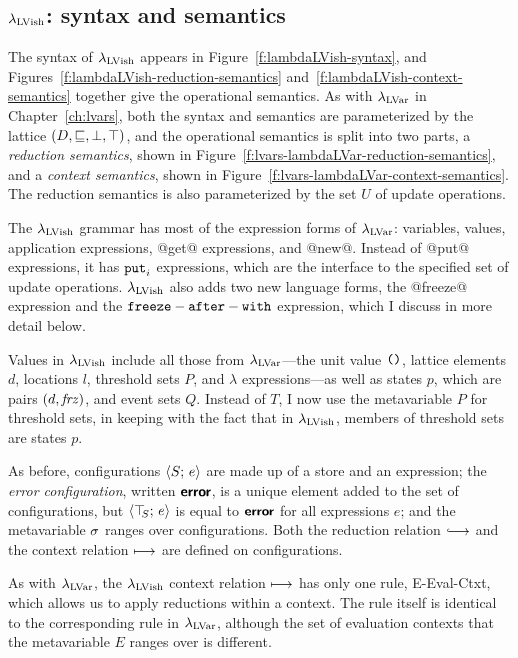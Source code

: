 \subsection{$\lambda_{\textrm{LVish}}$: syntax and semantics}

\FigLambdaLVishGrammar

\FigLambdaLVishReductionSemantics

\FigLambdaLVishContextSemantics

The syntax of $\lambda_{\textrm{LVish}}$ appears in
Figure~\ref{f:lambdaLVish-syntax}, and
Figures~\ref{f:lambdaLVish-reduction-semantics}
and~\ref{f:lambdaLVish-context-semantics} together give the
operational semantics.  As with $\lambda_{\textrm{LVar}}$ in
Chapter~\ref{ch:lvars}, both the syntax and semantics are
parameterized by the lattice $(D, \sqsubseteq, \bot, \top)$, and the
operational semantics is split into two parts, a \emph{reduction
  semantics}, shown in
Figure~\ref{f:lvars-lambdaLVar-reduction-semantics}, and a
\emph{context semantics}, shown in
Figure~\ref{f:lvars-lambdaLVar-context-semantics}.  The reduction
semantics is also parameterized by the set $U$ of update operations.

The $\lambda_{\textrm{LVish}}$ grammar has most of the expression forms of
$\lambda_{\textrm{LVar}}$: variables, values, application expressions, @get@
expressions, and @new@.  Instead of @put@ expressions, it has $\mbox{\texttt{put}}_i$
expressions, which are the interface to the specified set of update
operations.  $\lambda_{\textrm{LVish}}$ also adds two new language forms, the
@freeze@ expression and the ${\mbox{\texttt{freeze}}-\mbox{\texttt{after}}-\mbox{\texttt{with}}}$ expression, which I discuss in more
detail below.

Values in $\lambda_{\textrm{LVish}}$ include all those from $\lambda_{\textrm{LVar}}$---the
unit value $\mbox{\texttt{()}}$, lattice elements $d$, locations $l$, threshold
sets $P$, and $\lambda$ expressions---as well as states $p$, which are
pairs $(d, \mathit{frz})$, and event sets $Q$.  Instead of $T$, I now
use the metavariable $P$ for threshold sets, in keeping with the fact
that in $\lambda_{\textrm{LVish}}$, members of threshold sets are states $p$.

As before, configurations $\langle S;\, e \rangle$ are made up of a store and
an expression; the \emph{error configuration}, written $\textbf{\textsf{error}}$, is a
unique element added to the set of configurations, but
$\langle \top\hspace{-0.85mm}_{S};\, e \rangle$ is equal to $\textbf{\textsf{error}}$ for all expressions $e$; and
the metavariable $\sigma$ ranges over configurations.  Both the
reduction relation $\parstepsto$ and the context relation
$\longmapsto$ are defined on configurations.

As with $\lambda_{\textrm{LVar}}$, the $\lambda_{\textrm{LVish}}$ context relation
$\longmapsto$ has only one rule, {\sc E-Eval-Ctxt}, which allows us to
apply reductions within a context. The rule itself is identical to the
corresponding rule in $\lambda_{\textrm{LVar}}$, although the set of evaluation
contexts that the metavariable $E$ ranges over is different.

